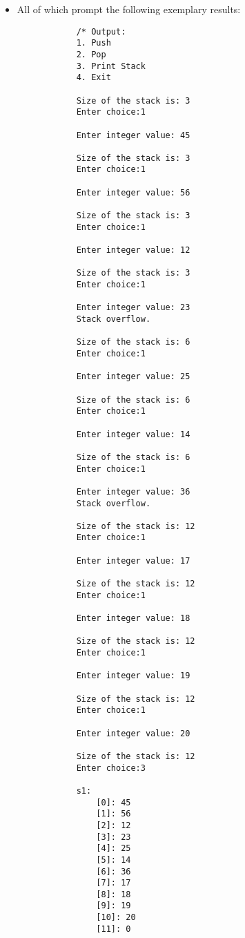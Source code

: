 \begin{itemize}
    \item All of which prompt the following exemplary results:
        \begin{verbatim}
            /* Output: 
            1. Push
            2. Pop
            3. Print Stack
            4. Exit

            Size of the stack is: 3
            Enter choice:1

            Enter integer value: 45

            Size of the stack is: 3
            Enter choice:1

            Enter integer value: 56

            Size of the stack is: 3
            Enter choice:1

            Enter integer value: 12

            Size of the stack is: 3
            Enter choice:1

            Enter integer value: 23
            Stack overflow.

            Size of the stack is: 6
            Enter choice:1

            Enter integer value: 25

            Size of the stack is: 6
            Enter choice:1

            Enter integer value: 14

            Size of the stack is: 6
            Enter choice:1

            Enter integer value: 36
            Stack overflow.

            Size of the stack is: 12
            Enter choice:1

            Enter integer value: 17

            Size of the stack is: 12
            Enter choice:1

            Enter integer value: 18

            Size of the stack is: 12
            Enter choice:1

            Enter integer value: 19

            Size of the stack is: 12
            Enter choice:1

            Enter integer value: 20

            Size of the stack is: 12
            Enter choice:3

            s1:
                [0]: 45
                [1]: 56
                [2]: 12
                [3]: 23
                [4]: 25
                [5]: 14
                [6]: 36
                [7]: 17
                [8]: 18
                [9]: 19
                [10]: 20
                [11]: 0


\end{verbatim}
\end{itemize}
